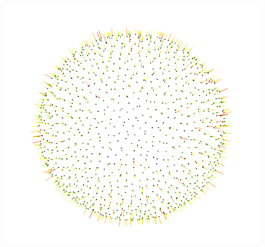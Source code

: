 \documentclass{beamer}
\begin{document}
\begin{frame}
\begin{figure}
        \includegraphics[scale=0.2]{img/sphere-sphere-1000-05}
    \end{figure}
\end{frame}
\end{document}
